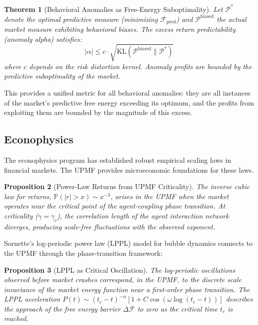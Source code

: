 \documentclass[12pt,a4paper]{article}
\newtheorem{theorem}{Theorem}[section]
\newtheorem{proposition}[theorem]{Proposition}
\theoremstyle{definition}
\newcommand{\Prob}{\mathbb{P}}
\newcommand{\PP}{\mathcal{P}}
\newcommand{\KL}{\mathrm{KL}}
\begin{document}
\begin{theorem}[Behavioral Anomalies as Free-Energy Suboptimality]\label{thm:behavioral}
Let $\PP^*$ denote the optimal predictive measure (minimizing $\mathcal{F}_{\text{pred}}$) and $\PP^{\text{biased}}$ the actual market measure exhibiting behavioral biases. The excess return predictability (anomaly alpha) satisfies:
\begin{equation}\label{eq:anomaly_alpha}
    |\alpha| \leq c \cdot \sqrt{\KL(\PP^{\text{biased}} \| \PP^*)}
\end{equation}
where $c$ depends on the risk distortion kernel. Anomaly profits are bounded by the predictive suboptimality of the market.
\end{theorem}

This provides a unified metric for all behavioral anomalies: they are all instances of the market's predictive free energy exceeding its optimum, and the profits from exploiting them are bounded by the magnitude of this excess.

\subsection{Econophysics}\label{sec:lit_econophysics}

The econophysics program \citep{mantegna2000,bouchaud2003,sornette2003,gabaix2003} has established robust empirical scaling laws in financial markets. The UPMF provides microeconomic foundations for these laws.

\begin{proposition}[Power-Law Returns from UPMF Criticality]\label{prop:power_law_upmf}
The inverse cubic law for returns, $\Prob(|r| > x) \sim x^{-3}$, arises in the UPMF when the market operates near the critical point of the agent-coupling phase transition. At criticality ($\gamma = \gamma_c$), the correlation length of the agent interaction network diverges, producing scale-free fluctuations with the observed exponent.
\end{proposition}

Sornette's \citeyearpar{sornette2003} log-periodic power law (LPPL) model for bubble dynamics connects to the UPMF through the phase-transition framework:

\begin{proposition}[LPPL as Critical Oscillation]\label{prop:lppl}
The log-periodic oscillations observed before market crashes correspond, in the UPMF, to the discrete scale invariance of the market energy function near a first-order phase transition. The LPPL acceleration $P(t) \sim (t_c - t)^{-\alpha}[1 + C \cos(\omega \log(t_c - t))]$ describes the approach of the free energy barrier $\Delta \mathcal{F}$ to zero as the critical time $t_c$ is reached.
\end{proposition}
\end{document}
